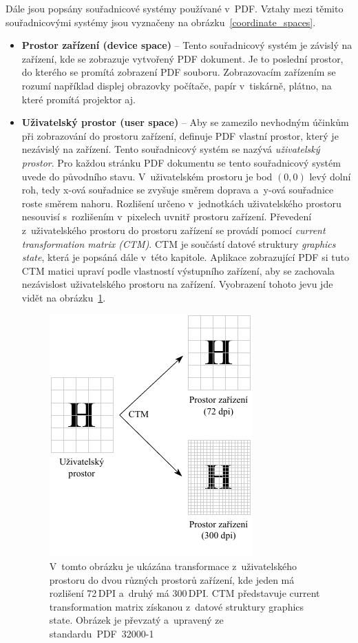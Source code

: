Dále jsou popsány souřadnicové systémy používané v~PDF. Vztahy mezi těmito
souřadnicovými systémy jsou vyznačeny na obrázku~\ref{coordinate_spaces}.
\begin{itemize}
    \item \textbf{Prostor zařízení (device space)} -- Tento souřadnicový systém je
    závislý na zařízení, kde se zobrazuje vytvořený PDF dokument. Je to poslední
    prostor, do kterého se promítá zobrazení PDF souboru. Zobrazovacím zařízením
    se rozumí například displej obrazovky počítače, papír v~tiskárně, plátno, na
    které promítá projektor aj.
    
    \item \textbf{Uživatelský prostor (user space)} -- Aby se zamezilo nevhodným
    účinkům při zobrazování do prostoru zařízení, definuje PDF vlastní prostor,
    který je nezávislý na zařízení. Tento souřadnicový systém se nazývá
    \emph{uživatelský prostor}. Pro každou stránku PDF dokumentu se tento
    souřadnicový systém uvede do původního stavu. V~uživatelském prostoru je bod
    $(0, 0)$ levý dolní roh, tedy x-ová souřadnice se zvyšuje směrem
    doprava a~y-ová souřadnice roste směrem nahoru. Rozlišení určeno v~jednotkách
    uživatelského prostoru nesouvisí s~rozlišením v~pixelech uvnitř prostoru
    zařízení. Převedení z~uživatelského prostoru do prostoru zařízení se provádí
    pomocí \emph{current transformation matrix (CTM)}. CTM je součástí datové
    struktury \emph{graphics state}, která je popsáná dále v~této kapitole.
    Aplikace zobrazující PDF si tuto CTM matici upraví podle vlastností výstupního
    zařízení, aby se zachovala nezávislost uživatelského prostoru na zařízení. 
    Vyobrazení tohoto jevu jde vidět na obrázku~\ref{pic_user_to_device}.

    \begin{figure}[H]
        \centering
        \includegraphics[width=0.5\linewidth]{obrazky-figures/user_to_device_space.pdf}
        \caption{
            V~tomto obrázku je ukázána transformace z~uživatelského prostoru
            do dvou různých prostorů zařízení, kde jeden má rozlišení 72\,DPI 
            a~druhý má 300\,DPI. CTM představuje current transformation matrix
            získanou z~datové struktury graphics state.
            Obrázek je převzatý a~upravený ze
            standardu~PDF~32000-1~\cite[k.~8.3.2.3, s.~116]{PDF32000-1:2008}
        }
        \label{pic_user_to_device}
    \end{figure}
    

\end{itemize}
